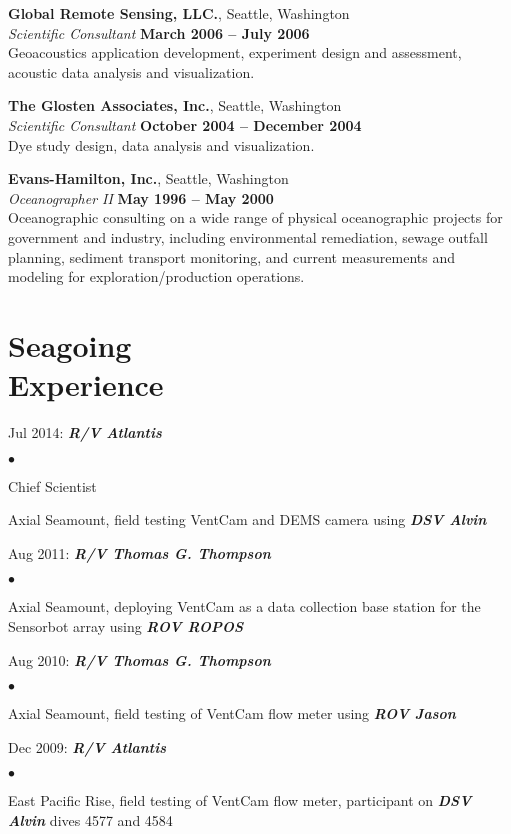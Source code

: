 \documentclass[11pt]{res}
\newenvironment{list2}{
  \begin{list}{$\bullet$}{%
      \setlength{\itemsep}{0in}
      \setlength{\parsep}{0in} \setlength{\parskip}{0in}
      \setlength{\topsep}{0in} \setlength{\partopsep}{0in} 
      \setlength{\leftmargin}{0.2in}}}{\end{list}}
\begin{document}
\begin{resume}
{\bf Global Remote Sensing, LLC.}, Seattle, Washington\\
{\em Scientific Consultant} \hfill {\bf March 2006 -- July 2006}\\
Geoacoustics application development, experiment design and assessment, acoustic data
analysis and visualization.

{\bf The Glosten Associates, Inc.}, Seattle, Washington\\
{\em Scientific Consultant} \hfill {\bf October 2004 -- December 2004}\\
Dye study design, data analysis and visualization.

{\bf Evans-Hamilton, Inc.}, Seattle, Washington\\
{\em Oceanographer II} \hfill {\bf May 1996 -- May 2000}\\
Oceanographic consulting on a wide range of physical oceanographic projects for government
and industry, including environmental remediation, sewage outfall planning, sediment
transport monitoring, and current measurements and modeling for exploration/production
operations.

\section{\sc Seagoing\\Experience}

Jul 2014: {\bf\em R/V Atlantis}
\begin{list2}
\item Chief Scientist
\item Axial Seamount, field testing VentCam and DEMS camera using {\bf\em DSV Alvin}
\end{list2}

\vspace*{-.1in}
Aug 2011: {\bf\em R/V Thomas G. Thompson}
\begin{list2}
\item Axial Seamount, deploying VentCam as a data collection base station for the Sensorbot array using {\bf\em ROV ROPOS}
\end{list2}

\vspace*{-.1in}
Aug 2010: {\bf\em R/V Thomas G. Thompson}
\begin{list2}
\item Axial Seamount, field testing of VentCam flow meter using {\bf\em ROV Jason}
\end{list2}

\vspace*{-.1in}
Dec 2009: {\bf\em R/V Atlantis}
\begin{list2}
\item East Pacific Rise, field testing of VentCam flow meter, participant on {\bf\em DSV Alvin} dives 4577 and 4584
\end{list2}


\end{resume}
\end{document}
